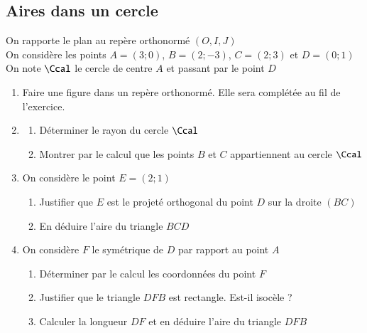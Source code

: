 \documentclass[oneside,12pt]{article}          %
\begin{document}
\subsection{Aires dans un cercle}
On rapporte le plan au repère orthonormé $(O,I,J)$\\
On considère les points $A=(3;0)$, $B=(2;-3)$, $C=(2;3)$ et $D=(0;1)$ \\
On note $\Ccal$ le cercle de centre $A$ et passant par le point $D$
\begin{enumerate}
	\item Faire une figure dans un repère orthonormé. Elle sera complétée au fil de l'exercice.
	\item \begin{enumerate}
		\item Déterminer le rayon du cercle $\Ccal$
		\item Montrer par le calcul que les points $B$ et $C$ appartiennent au cercle $\Ccal$
	\end{enumerate}
	\item On considère le point $E=(2;1)$
	\begin{enumerate}
		\item Justifier que $E$ est le projeté orthogonal du point $D$ sur la droite $(BC)$
		\item En déduire l'aire du triangle $BCD$
	\end{enumerate}
	\item On considère $F$ le symétrique de $D$ par rapport au point $A$
	\begin{enumerate}
		\item Déterminer par le calcul les coordonnées du point $F$
		\item Justifier que le triangle $DFB$ est rectangle. Est-il isocèle ?
		\item Calculer la longueur $DF$ et en déduire l'aire du triangle $DFB$
	\end{enumerate}
\end{enumerate}
\end{document}
